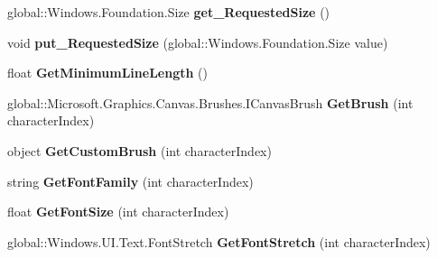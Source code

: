\begin{DoxyCompactItemize}
global\+::\+Windows.\+Foundation.\+Size {\bfseries get\+\_\+\+Requested\+Size} ()
\item 
\mbox{\label{class_microsoft_1_1_graphics_1_1_canvas_1_1_text_1_1_canvas_text_layout_a2f3f911ee1fbeb9d18674696d30e71ad}} 
void {\bfseries put\+\_\+\+Requested\+Size} (global\+::\+Windows.\+Foundation.\+Size value)
\item 
\mbox{\label{class_microsoft_1_1_graphics_1_1_canvas_1_1_text_1_1_canvas_text_layout_a238de0e21932bea51610979705559db4}} 
float {\bfseries Get\+Minimum\+Line\+Length} ()
\item 
\mbox{\label{class_microsoft_1_1_graphics_1_1_canvas_1_1_text_1_1_canvas_text_layout_a0c810e107e704b45bc815cf10ec80e67}} 
global\+::\+Microsoft.\+Graphics.\+Canvas.\+Brushes.\+I\+Canvas\+Brush {\bfseries Get\+Brush} (int character\+Index)
\item 
\mbox{\label{class_microsoft_1_1_graphics_1_1_canvas_1_1_text_1_1_canvas_text_layout_ab9ac76cc2bcb25f7196995587caf4e68}} 
object {\bfseries Get\+Custom\+Brush} (int character\+Index)
\item 
\mbox{\label{class_microsoft_1_1_graphics_1_1_canvas_1_1_text_1_1_canvas_text_layout_af4f53cf9d9dddc4bfa0669a57c6a4084}} 
string {\bfseries Get\+Font\+Family} (int character\+Index)
\item 
\mbox{\label{class_microsoft_1_1_graphics_1_1_canvas_1_1_text_1_1_canvas_text_layout_a0597b8dfd8edb6f68a71f116703648c7}} 
float {\bfseries Get\+Font\+Size} (int character\+Index)
\item 
\mbox{\label{class_microsoft_1_1_graphics_1_1_canvas_1_1_text_1_1_canvas_text_layout_a7ae8624ebdfdcb49fb9d365b6c8c6404}} 
global\+::\+Windows.\+U\+I.\+Text.\+Font\+Stretch {\bfseries Get\+Font\+Stretch} (int character\+Index)

\end{DoxyCompactItemize}

